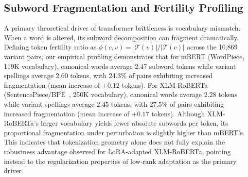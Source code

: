 \subsection{Subword Fragmentation and Fertility Profiling}
A primary theoretical driver of transformer brittleness is vocabulary mismatch. When a word is altered, its subword decomposition can fragment dramatically. Defining token fertility ratio as $\phi(c, v) = |\mathcal{T}(v)| / |\mathcal{T}(c)|$ across the 10,869 variant pairs, our empirical profiling demonstrates that for mBERT (WordPiece, 119K vocabulary), canonical words average 2.47 subword tokens while variant spellings average 2.60 tokens, with 24.3\% of pairs exhibiting increased fragmentation (mean increase of $+0.12$ tokens). For XLM-RoBERTa (SentencePiece/BPE~\cite{kudo2018sentencepiece}, 250K vocabulary), canonical words average 2.28 tokens while variant spellings average 2.45 tokens, with 27.5\% of pairs exhibiting increased fragmentation (mean increase of $+0.17$ tokens). Although XLM-RoBERTa's larger vocabulary yields fewer absolute subwords per token, its proportional fragmentation under perturbation is slightly higher than mBERT's. This indicates that tokenization geometry alone does not fully explain the robustness advantage observed for LoRA-adapted XLM-RoBERTa, pointing instead to the regularization properties of low-rank adaptation as the primary driver.
